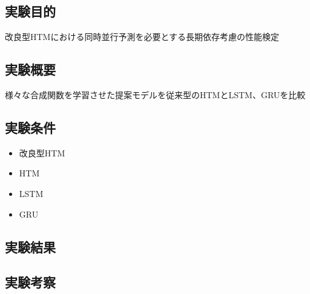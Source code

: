 \subsection{実験目的}
改良型HTMにおける同時並行予測を必要とする長期依存考慮の性能検定

\subsection{実験概要}
様々な合成関数を学習させた提案モデルを従来型のHTMとLSTM、GRUを比較

\subsection{実験条件}

\begin{itemize}
  \item 改良型HTM
  \item HTM
  \item LSTM
  \item GRU\cite{GRU}
\end{itemize}

\subsection{実験結果}
\subsection{実験考察}
